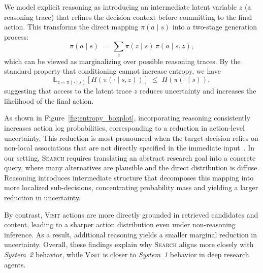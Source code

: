 We model explicit reasoning as introducing an intermediate latent variable $z$ (a reasoning trace) that refines the decision context before committing to the final action.
This transforms the direct mapping $\pi(a \mid s)$ into a two-stage generation process:
\begin{equation}
\pi(a \mid s) \;=\; \sum_{z} \pi(z \mid s)\,\pi(a \mid s, z),
\label{eq:latent_factorization}
\end{equation}
which can be viewed as marginalizing over possible reasoning traces.
By the standard property that conditioning cannot increase entropy, we have
\begin{equation}
\mathbb{E}_{z\sim \pi(\cdot\mid s)}\!\left[ H(\pi(\cdot \mid s, z)) \right] \;\le\; H(\pi(\cdot \mid s)),
\label{eq:entropy_reduction}
\end{equation}
suggesting that access to the latent trace $z$ reduces uncertainty and increases the likelihood of the final action.


As shown in Figure~\ref{fig:entropy_boxplot}, incorporating reasoning consistently increases action log probabilities, corresponding to a reduction in action-level uncertainty.
This reduction is most pronounced when the target decision relies on non-local associations that are not directly specified in the immediate input~\cite{prystawski2023think}.
In our setting, \textsc{Search} requires translating an abstract research goal into a concrete query, where many alternatives are plausible and the direct distribution is diffuse.
Reasoning introduces intermediate structure that decomposes this mapping into more localized sub-decisions, concentrating probability mass and yielding a larger reduction in uncertainty.

By contrast, \textsc{Visit} actions are more directly grounded in retrieved candidates and content, leading to a sharper action distribution even under non-reasoning inference.
As a result, additional reasoning yields a smaller marginal reduction in uncertainty.
Overall, these findings explain why \textsc{Search} aligns more closely with \emph{System~2} behavior, while \textsc{Visit} is closer to \emph{System~1} behavior in deep research agents.

\fi



